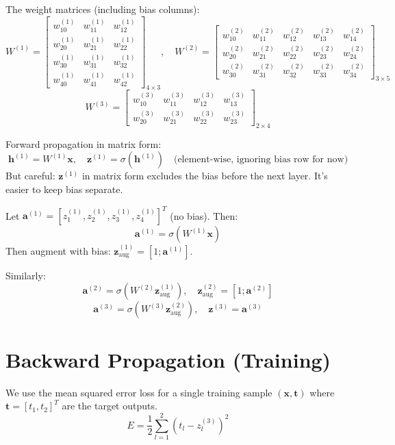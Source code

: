 \documentclass{tufte-handout}
\begin{document}
The weight matrices (including bias columns):
\[
W^{(1)} = \begin{bmatrix}
w^{(1)}_{10} & w^{(1)}_{11} & w^{(1)}_{12} \\
w^{(1)}_{20} & w^{(1)}_{21} & w^{(1)}_{22} \\
w^{(1)}_{30} & w^{(1)}_{31} & w^{(1)}_{32} \\
w^{(1)}_{40} & w^{(1)}_{41} & w^{(1)}_{42}
\end{bmatrix}_{4 \times 3}, \quad
W^{(2)} = \begin{bmatrix}
w^{(2)}_{10} & w^{(2)}_{11} & w^{(2)}_{12} & w^{(2)}_{13} & w^{(2)}_{14} \\
w^{(2)}_{20} & w^{(2)}_{21} & w^{(2)}_{22} & w^{(2)}_{23} & w^{(2)}_{24} \\
w^{(2)}_{30} & w^{(2)}_{31} & w^{(2)}_{32} & w^{(2)}_{33} & w^{(2)}_{34}
\end{bmatrix}_{3 \times 5}
\]
\[
W^{(3)} = \begin{bmatrix}
w^{(3)}_{10} & w^{(3)}_{11} & w^{(3)}_{12} & w^{(3)}_{13} \\
w^{(3)}_{20} & w^{(3)}_{21} & w^{(3)}_{22} & w^{(3)}_{23}
\end{bmatrix}_{2 \times 4}
\]

Forward propagation in matrix form:
\[
\mathbf{h}^{(1)} = W^{(1)} \mathbf{x}, \quad \mathbf{z}^{(1)} = \sigma(\mathbf{h}^{(1)}) \quad \text{(element-wise, ignoring bias row for now)}
\]
But careful: $\mathbf{z}^{(1)}$ in matrix form excludes the bias before the next layer. It's easier to keep bias separate.

Let $\mathbf{a}^{(1)} = [z^{(1)}_1, z^{(1)}_2, z^{(1)}_3, z^{(1)}_4]^T$ (no bias). Then:
\[
\mathbf{a}^{(1)} = \sigma\left( W^{(1)} \mathbf{x} \right)
\]
Then augment with bias: $\mathbf{z}^{(1)}_{\text{aug}} = [1; \mathbf{a}^{(1)}]$.

Similarly:
\[
\mathbf{a}^{(2)} = \sigma\left( W^{(2)} \mathbf{z}^{(1)}_{\text{aug}} \right), \quad \mathbf{z}^{(2)}_{\text{aug}} = [1; \mathbf{a}^{(2)}]
\]
\[
\mathbf{a}^{(3)} = \sigma\left( W^{(3)} \mathbf{z}^{(2)}_{\text{aug}} \right), \quad \mathbf{z}^{(3)} = \mathbf{a}^{(3)}
\]

\section{Backward Propagation (Training)}
We use the mean squared error loss for a single training sample $(\mathbf{x}, \mathbf{t})$ where $\mathbf{t} = [t_1, t_2]^T$ are the target outputs.
\[
E = \frac{1}{2} \sum_{l=1}^{2} (t_l - z^{(3)}_l)^2
\]
\end{document}
